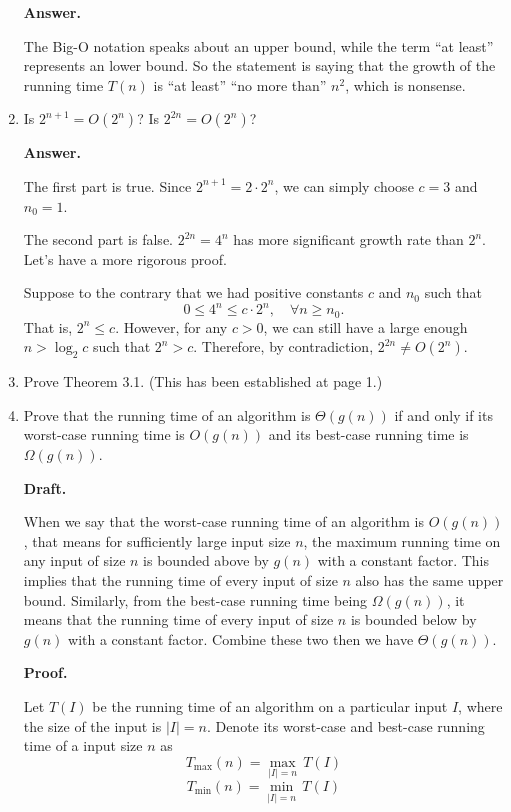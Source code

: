 \documentclass[12pt]{article}
\begin{document}
\begin{enumerate}
    \textbf{Answer.}

    The Big-O notation speaks about an upper bound, while the term ``at least'' represents an lower bound. So the statement is saying that the growth of the running time \(T(n)\) is ``at least'' ``no more than'' \(n^2\), which is nonsense.

    \item Is \(2^{n+1} = O(2^n)\)? Is \(2^{2n} = O(2^n)\)?

    \textbf{Answer.}

    The first part is true. Since \(2^{n+1} = 2 \cdot 2^{n}\), we can simply choose \(c = 3\) and \(n_0 = 1\).

    The second part is false. \(2^{2n} = 4^{n}\) has more significant growth rate than \(2^n\). Let's have a more rigorous proof.

    Suppose to the contrary that we had positive constants \(c\) and \(n_0\) such that
    \[
        0 \leq 4^n \leq c \cdot 2^n, \quad \forall n \geq n_0.
    \]
    That is, \(2^n \leq c\). However, for any \(c > 0\), we can still have a large enough \(n > \log_2{c}\) such that \(2^n > c\). Therefore, by contradiction, \(2^{2n} \neq O(2^n)\).

    \item Prove Theorem 3.1. (This has been established at page 1.)

    \item Prove that the running time of an algorithm is \(\Theta(g(n))\) if and only if its worst-case running time is \(O(g(n))\) and its best-case running time is \(\Omega(g(n))\).

    \textbf{Draft.}

    When we say that the worst-case running time of an algorithm is \(O(g(n))\), that means for sufficiently large input size \(n\), the maximum running time on any input of size \(n\) is bounded above by \(g(n)\) with a constant factor. This implies that the running time of every input of size \(n\) also has the same upper bound.
    Similarly, from the best-case running time being \(\Omega(g(n))\), it means that the running time of every input of size \(n\) is bounded below by \(g(n)\) with a constant factor. Combine these two then we have \(\Theta(g(n))\).

    \textbf{Proof.}

    Let \(T(I)\) be the running time of an algorithm on a particular input \(I\), where the size of the input is \(|I| = n\). Denote its worst-case and best-case running time of a input size \(n\) as
    \[
        T_{\max}(n) = \max_{|I| = n} \, T(I)
    \]
    \[
        T_{\min}(n) = \min_{|I| = n} \, T(I)
    \]
    

\end{enumerate}
\end{document}
